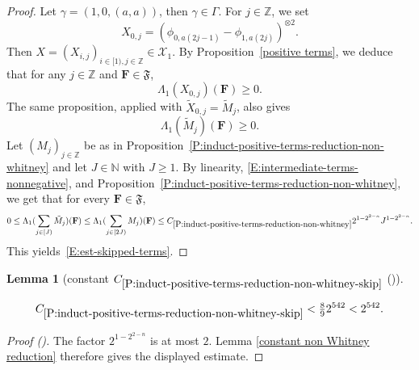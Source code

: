\documentclass[12pt,reqno]{amsart}
\newcommand{\auto}{{({\tiny\faCar})}}
\theoremstyle{plain}
\newtheorem{lemma}[theorem]{Lemma}
\numberwithin{equation}{section}
\theoremstyle{remark}
\newcommand{\uses}[1]{}
\newcommand{\usesdefs}[1]{}
\newcommand{\leanok}{}
\newcommand{\lean}[1]{}
\newcommand{\Z}{{\mathbb Z}}
\newcommand{\N}{{\mathbb N}}
\begin{document}
\begin{proof}
Let $\gamma=(1,0,(a,a))$, then $\gamma \in \Gamma$. For $j\in \Z$, we set
\[
X_{0,j}=({\phi}_{0,a(2j-1)}-{\phi}_{1,a(2j)})^{\otimes 2}.
\]
Then $X=(X_{i,j})_{i\in [1),j\in \Z} \in \mathcal X_1$. By Proposition~\ref{positive terms}, we deduce that for any $j\in \Z$ and $\mathbf{F} \in \mathfrak{F}$,
\begin{equation}\label{E:intermediate-terms-nonnegative}
\Lambda_1(X_{0,j})(\mathbf{F}) \geq 0.
\end{equation}
The same proposition, applied with $\widetilde X_{0,j}=\widetilde M_j$, also gives
\[
\Lambda_1(\widetilde M_j)(\mathbf F)\ge0.
\]
Let $(M_j)_{j\in \Z}$ be as in Proposition~\ref{P:induct-positive-terms-reduction-non-whitney} and let $J\in\N$ with $J\ge1$. By linearity, \eqref{E:intermediate-terms-nonnegative}, and Proposition~\ref{P:induct-positive-terms-reduction-non-whitney}, we get that for every $\mathbf{F} \in \mathfrak{F}$,
\[
0\le\Lambda_1(\sum_{j\in [J)} \tilde{M}_j)(\mathbf{F})
\leq \Lambda_1(\sum_{j\in [2J)} M_j)(\mathbf{F})
\leq C_{\ref{P:induct-positive-terms-reduction-non-whitney}} 2^{1-2^{2-n}} J^{1-2^{2-n}}.
\]
This yields~\eqref{E:est-skipped-terms}.
\end{proof}

\begin{lemma}[constant $C_{\ref{P:induct-positive-terms-reduction-non-whitney-skip}}$ \auto]\label{constant non Whitney skip reduction}\uses{constant non Whitney reduction,P:induct-positive-terms-reduction-non-whitney-skip}\usesdefs{}
\lean{Auto.constantNonWhitneySkipReduction}
\leanok
\begin{equation}\label{constant non Whitney skip reduction bound}
C_{\ref{P:induct-positive-terms-reduction-non-whitney-skip}}
<\tfrac89 2^{542}<2^{542}.
\end{equation}
\end{lemma}
\begin{proof}[Proof \auto]
The factor $2^{1-2^{2-n}}$ is at most $2$. Lemma \ref{constant non Whitney reduction} therefore gives the displayed estimate.
\end{proof}
\end{document}
